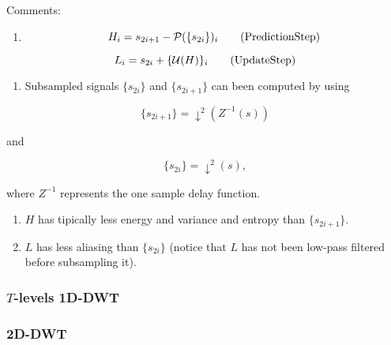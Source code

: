 Comments:

\begin{enumerate}
\def\labelenumi{\arabic{enumi}.}
\tightlist
\item
  \begin{equation}
  H_i = s_{2i+1} - {\cal P}(\{s_{2i}\})_i
  \tag{PredictionStep}
  \label{eq:PredictionStep}
  \end{equation}
\end{enumerate}

\begin{equation}
  L_i = s_{2i} + \{{\cal U}(H)\}_i
  \tag{UpdateStep}
  \label{eq:UpdateStep}
\end{equation}

\begin{enumerate}
\def\labelenumi{\arabic{enumi}.}
\setcounter{enumi}{1}
\tightlist
\item
  Subsampled signals \(\{s_{2i}\}\) and \(\{s_{2i+1}\}\) can been
  computed by using
\end{enumerate}

\begin{equation*}
   \{s_{2i+1}\} = \downarrow^2(Z^{-1}(s))
\end{equation*}

and

\begin{equation*}
   \{s_{2i}\} = \downarrow^2(s),
\end{equation*}

where \(Z^{-1}\) represents the one sample delay function.

\begin{enumerate}
\def\labelenumi{\arabic{enumi}.}
\setcounter{enumi}{2}
\tightlist
\item
  \(H\) has tipically less energy and variance and entropy than
  \(\{s_{2i+1}\}\).
\item
  \(L\) has less aliasing than \(\{s_{2i}\}\) (notice that \(L\) has not
  been low-pass filtered before subsampling it).
\end{enumerate}

    \hypertarget{t-levels-1d-dwt}{%
\subsubsection{\texorpdfstring{\(T\)-levels
1D-DWT}{T-levels 1D-DWT}}\label{t-levels-1d-dwt}}

    \hypertarget{d-dwt}{%
\subsubsection{2D-DWT}\label{d-dwt}}

